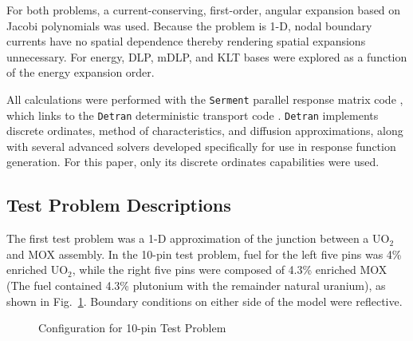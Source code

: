 \documentclass[5p,times,twocolumn,10pt]{elsarticle}
\begin{document}
    For both problems, a current-conserving, first-order, angular expansion
    based on Jacobi polynomials \cite{Roberts2014} was used.  Because the
    problem is 1-D, nodal boundary currents have no spatial dependence thereby
    rendering spatial expansions unnecessary. For energy, DLP, mDLP, and KLT
    bases were explored as a function of the energy expansion order.

    All calculations were performed with the {\tt Serment} parallel response
    matrix code \cite{RobertsSerment}, which links to the {\tt Detran}
    deterministic transport code \cite{RobertsDetran}. {\tt Detran} implements
    discrete ordinates, method of characteristics, and diffusion
    approximations, along with several advanced solvers developed specifically
    for use in response function generation. For this paper, only its discrete
    ordinates capabilities were used.

    \subsection{Test Problem Descriptions}
    The first test problem was a 1-D approximation of the junction between a
    UO$_2$ and MOX assembly.
    In the 10-pin test problem, fuel for the left five pins was
    4\% enriched UO$_2$, while the right five pins were composed of
    4.3\% enriched MOX (The fuel contained 4.3\% plutonium with the remainder
    natural uranium), as shown in Fig.~\ref{fig:10-pin_config}. Boundary
    conditions on either
    side of the model were reflective.

    \begin{figure}[htb]
        \centering
        \caption{Configuration for 10-pin Test Problem}
        \label{fig:10-pin_config}
    \end{figure}
\end{document}
